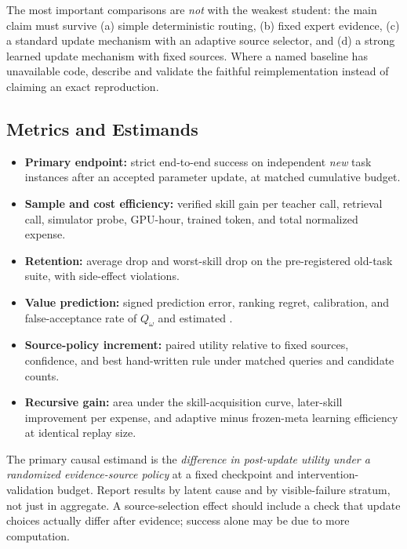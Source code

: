 The most important comparisons are \emph{not} with the weakest
student: the main claim must survive (a) simple deterministic
routing, (b) fixed expert evidence, (c) a standard update mechanism
with an adaptive source selector, and (d) a strong learned update
mechanism with fixed sources. Where a named baseline has
unavailable code, describe and validate the faithful
reimplementation instead of claiming an exact reproduction.

\subsection{Metrics and Estimands}
\label{sec:metrics}
\begin{itemize}
\item \textbf{Primary endpoint:} strict end-to-end success on
      independent \emph{new} task instances after an accepted
      parameter update, at matched cumulative budget.
\item \textbf{Sample and cost efficiency:} verified skill gain per
      teacher call, retrieval call, simulator probe, GPU-hour,
      trained token, and total normalized expense.
\item \textbf{Retention:} average drop and worst-skill drop on the
      pre-registered old-task suite, with side-effect violations.
\item \textbf{Value prediction:} signed prediction error, ranking
      regret, calibration, and false-acceptance rate of
      $Q_\omega$ and estimated \pivoi{}.
\item \textbf{Source-policy increment:} paired utility relative to
      fixed sources, confidence, and best hand-written rule
      under matched queries and candidate counts.
\item \textbf{Recursive gain:} area under the skill-acquisition
      curve, later-skill improvement per expense, and adaptive
      minus frozen-meta learning efficiency at identical replay size.
\end{itemize}

The primary causal estimand is the \emph{difference in post-update
utility under a randomized evidence-source policy} at a fixed
checkpoint and intervention-validation budget. Report results by
latent cause and by visible-failure stratum, not just in aggregate.
A source-selection effect should include a check that update choices
actually differ after evidence; success alone may be due to more
computation.

